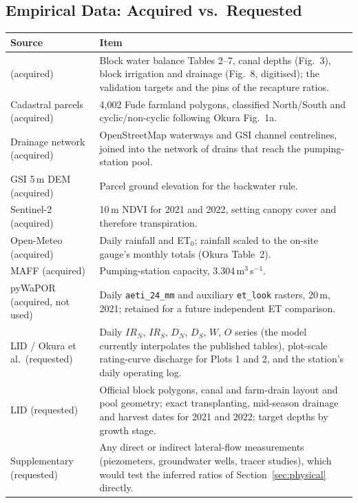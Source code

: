 \documentclass{article}
\begin{document}
\subsection{Empirical Data: Acquired vs.\ Requested}
\begin{changed}
\centering
\small
{}
\begin{tabular}{|p{3.4cm}|p{12.8cm}|}
    \hline
    \rowcolor[HTML]{F8F319}
    \textbf{Source} & \textbf{Item} \\ \hline
    \cite{Okura2025WaterBalance} (acquired) & Block water balance Tables 2--7, canal depths (Fig.~3), block irrigation and drainage (Fig.~8, digitised); the validation targets and the pins of the recapture ratios. \\ \hline
    Cadastral parcels (acquired) & 4,002 Fude farmland polygons, classified North/South and cyclic/non-cyclic following Okura Fig.~1a. \\ \hline
    Drainage network (acquired) & OpenStreetMap waterways and GSI channel centrelines, joined into the network of drains that reach the pumping-station pool. \\ \hline
    GSI 5\,m DEM (acquired) & Parcel ground elevation for the backwater rule. \\ \hline
    Sentinel-2 (acquired) & 10\,m NDVI for 2021 and 2022, setting canopy cover and therefore transpiration. \\ \hline
    Open-Meteo (acquired) & Daily rainfall and ET$_0$; rainfall scaled to the on-site gauge's monthly totals (Okura Table~2). \\ \hline
    MAFF (acquired) & Pumping-station capacity, 3.304\,m$^3$\,s$^{-1}$. \\ \hline
    pyWaPOR (acquired, not used) & Daily \texttt{aeti\_24\_mm} and auxiliary \texttt{et\_look} rasters, 20\,m, 2021; retained for a future independent ET comparison. \\ \hline
    LID / Okura et al.\ (requested) & Daily $IR_N$, $IR_S$, $D_N$, $D_S$, $W$, $O$ series (the model currently interpolates the published tables), plot-scale rating-curve discharge for Plots 1 and 2, and the station's daily operating log. \\ \hline
    LID (requested) & Official block polygons, canal and farm-drain layout and pool geometry; exact transplanting, mid-season drainage and harvest dates for 2021 and 2022; target depths by growth stage. \\ \hline
    Supplementary (requested) & Any direct or indirect lateral-flow measurements (piezometers, groundwater wells, tracer studies), which would test the inferred ratios of Section~\ref{sec:physical} directly. \\ \hline
\end{tabular}
\label{tab:data_acquired}
\end{changed}
\end{document}
